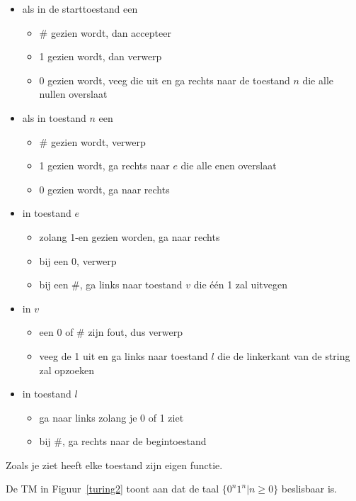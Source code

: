 \begin{itemize}
\item als in de starttoestand een
\begin{itemize}
\item \# gezien wordt, dan accepteer
\item 1 gezien wordt, dan verwerp
\item 0 gezien wordt, veeg die uit en ga rechts naar de toestand $n$ die alle
nullen overslaat
\end{itemize}

\item als in toestand $n$ een
\begin{itemize}
\item \# gezien wordt, verwerp
\item 1 gezien wordt, ga rechts naar $e$ die alle enen overslaat
\item 0 gezien wordt, ga naar rechts
\end{itemize}


\item in toestand $e$
\begin{itemize}
\item zolang 1-en gezien worden, ga naar rechts
\item bij een 0, verwerp
\item bij een \#, ga links naar toestand $v$ die \'{e}\'{e}n 1 zal uitvegen
\end{itemize}

\item in $v$
\begin{itemize}
\item een 0 of \# zijn fout, dus verwerp
\item veeg de 1 uit en ga links naar toestand $l$ die de linkerkant
van de string zal opzoeken
\end{itemize}

\item in toestand $l$
\begin{itemize}
\item ga naar links zolang je 0 of 1 ziet
\item bij \#, ga rechts naar de begintoestand
\end{itemize}

\end{itemize}

Zoals je ziet heeft elke toestand zijn eigen functie.


De TM in Figuur~\ref{turing2} toont aan dat de taal
%
$\{0^n1^n|n \geq 0\}$ beslisbaar is. 

